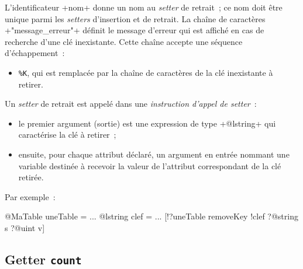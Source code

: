 L'identificateur \ggst+nom+ donne un nom au \emph{setter} de retrait~; ce nom doit être unique parmi les \emph{setters} d'insertion et de retrait. La chaîne de caractères \ggst+"message_erreur"+ définit le message d'erreur qui est affiché en cas de recherche d'une clé inexistante. Cette chaîne accepte une séquence d'échappement~:
\begin{itemize}
  \item \texttt{\%K}, qui est remplacée par la chaîne de caractères de la clé inexistante à retirer.
\end{itemize}


Un \emph{setter} de retrait est appelé dans une \emph{instruction d'appel de setter}~:
\begin{itemize}
  \item le premier argument (sortie) est une expression de type \ggst+@lstring+ qui caractérise la clé à retirer~;
  \item ensuite, pour chaque attribut déclaré, un argument en entrée nommant une variable destinée à recevoir la valeur de l'attribut correspondant de la clé retirée.
\end{itemize}

Par exemple~:
\begin{galgas3}
@MaTable uneTable = {}
...
@lstring clef = ...
[!?uneTable removeKey !clef ?@string s ?@uint v]
\end{galgas3}


%
%

\subsection{Getter \texttt{count}}

